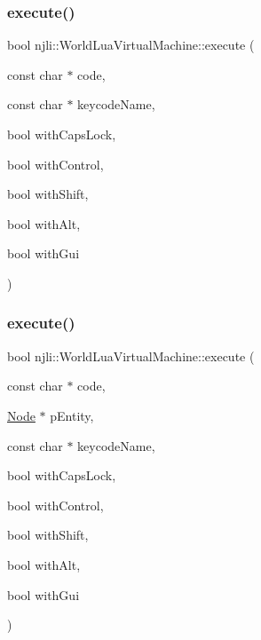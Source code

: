 \subsubsection{\texorpdfstring{execute()}{execute()}\hspace{0.1cm}{\footnotesize\ttfamily [31/33]}}
{\footnotesize\ttfamily bool njli\+::\+World\+Lua\+Virtual\+Machine\+::execute (\begin{DoxyParamCaption}\item[{const char $\ast$}]{code,  }\item[{const char $\ast$}]{keycode\+Name,  }\item[{bool}]{with\+Caps\+Lock,  }\item[{bool}]{with\+Control,  }\item[{bool}]{with\+Shift,  }\item[{bool}]{with\+Alt,  }\item[{bool}]{with\+Gui }\end{DoxyParamCaption})}

\mbox{\label{classnjli_1_1_world_lua_virtual_machine_ad08f708d623dbd72a3a57768c2857eaa}} 
\subsubsection{\texorpdfstring{execute()}{execute()}\hspace{0.1cm}{\footnotesize\ttfamily [32/33]}}
{\footnotesize\ttfamily bool njli\+::\+World\+Lua\+Virtual\+Machine\+::execute (\begin{DoxyParamCaption}\item[{const char $\ast$}]{code,  }\item[{\mbox{\hyperlink{classnjli_1_1_node}{Node}} $\ast$}]{p\+Entity,  }\item[{const char $\ast$}]{keycode\+Name,  }\item[{bool}]{with\+Caps\+Lock,  }\item[{bool}]{with\+Control,  }\item[{bool}]{with\+Shift,  }\item[{bool}]{with\+Alt,  }\item[{bool}]{with\+Gui }\end{DoxyParamCaption})}

